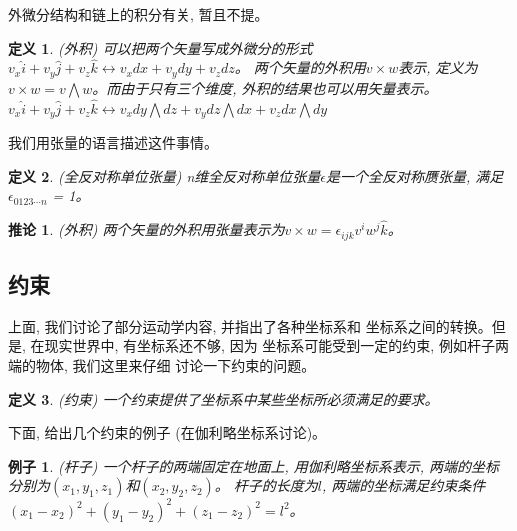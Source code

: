 \documentclass{ctexart}
\numberwithin{equation}{subsection}
\numberwithin{theorem}{subsection}
\newtheorem{definition} {定义}
\numberwithin{definition}{subsection}
\numberwithin{proof}{subsection}
\numberwithin{lemma}{subsection}
\newtheorem{example}    {例子}
\numberwithin{example}{subsection}
\numberwithin{remark}{subsection}
\newtheorem{corollary}  {推论}
\numberwithin{corollary}{subsection}
\numberwithin{exercise}{subsection}
\numberwithin{problem}{subsection}
\numberwithin{question}{section}
\numberwithin{method}{subsection}
\begin{document}
    外微分结构和链上的积分有关, 暂且不提。

    \begin{definition}
        \label{1.3 def:exterior product}
        (外积) 可以把两个矢量写成外微分的形式\(v_x\hat{i} + v_y\hat{j} + v_z \hat{k} \leftrightarrow v_x dx + v_y dy + v_z dz\)。
        两个矢量的外积用\(v \times w\)表示, 定义为\(v \times w = v \bigwedge w\)。而由于只有三个维度, 外积的结果也可以用矢量表示。
        \(v_x\hat{i} + v_y\hat{j} + v_z \hat{k} \leftrightarrow v_x dy \bigwedge dz + v_y dz \bigwedge dx + v_z dx \bigwedge dy\)
    \end{definition}

    我们用张量的语言描述这件事情。

    \begin{definition}
        \label{1.3 def:anti delta}
        (全反对称单位张量) n维全反对称单位张量\(\epsilon\)是一个全反对称赝张量, 
        满足\(\epsilon_{0123\cdots n}\) = 1。
    \end{definition}

    \begin{corollary}
        \label{1.3 cor:exterior product}
        (外积) 两个矢量的外积用张量表示为\(v \times w = \epsilon_{ijk} v^i w^j \hat{k}\)。
    \end{corollary}


    \subsection{约束}

    上面, 我们讨论了部分运动学内容, 并指出了各种坐标系和
    坐标系之间的转换。但是, 在现实世界中, 有坐标系还不够, 因为
    坐标系可能受到一定的约束, 例如杆子两端的物体, 我们这里来仔细
    讨论一下约束的问题。

    \begin{definition}
        \label{1.4 def:constraint}
        (约束) 一个约束提供了坐标系中某些坐标所必须满足的要求。
    \end{definition}

    下面, 给出几个约束的例子 (在伽利略坐标系讨论)。

    \begin{example}
        \label{1.4 ex:stick}
        (杆子) 一个杆子的两端固定在地面上, 用伽利略坐标系表示, 
        两端的坐标分别为\((x_1, y_1, z_1)\)和\((x_2, y_2, z_2)\)。
        杆子的长度为\(l\), 两端的坐标满足约束条件
        \((x_1 - x_2)^2 + (y_1 - y_2)^2 + (z_1 - z_2)^2 = l^2\)。
    \end{example}
\end{document}

